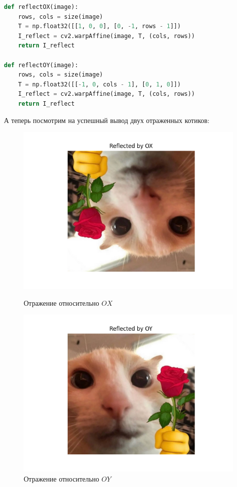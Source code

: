 \documentclass[a4paper,12pt]{article}
\begin{document}
\begin{lstlisting}[language=Python, caption=Функции отражения]
def reflectOX(image):
    rows, cols = size(image)
    T = np.float32([[1, 0, 0], [0, -1, rows - 1]])
    I_reflect = cv2.warpAffine(image, T, (cols, rows))
    return I_reflect

def reflectOY(image):
    rows, cols = size(image)
    T = np.float32([[-1, 0, cols - 1], [0, 1, 0]])
    I_reflect = cv2.warpAffine(image, T, (cols, rows))
    return I_reflect
\end{lstlisting}

А теперь посмотрим на успешный вывод двух отраженных котиков:

\begin{figure}[H]
    \centering
    \begin{minipage}{0.48\textwidth}
        \centering
        \includegraphics[width=\linewidth]{lab2/task1/Figure_3.png}
        \caption{Отражение относительно \( OX \)}
        \label{fig:reflect_ox}
    \end{minipage}
    \hfill
    \begin{minipage}{0.48\textwidth}
        \centering
        \includegraphics[width=\linewidth]{lab2/task1/Figure_4.png}
        \caption{Отражение относительно \( OY \)}
        \label{fig:reflect_oy}
    \end{minipage}
\end{figure}
\end{document}
